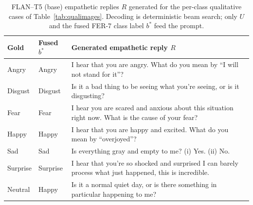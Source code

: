 \documentclass[sigconf,nonacm]{acmart}
\begin{document}
\begin{table}[!htbp]
  \small
  \centering
  \caption{FLAN--T5 (base) empathetic replies $R$ generated for the per-class qualitative cases of Table~\ref{tab:qualimages}. Decoding is deterministic beam search; only $U$ and the fused FER-7 class label $b^{*}$ feed the prompt.}
  \label{tab:qualresponses}
  \setlength{\tabcolsep}{4pt}
  \renewcommand{\arraystretch}{1.2}
  \begin{tabular}{@{}l l p{}@{}}
    \toprule
    \textbf{Gold} & \textbf{Fused $b^{*}$} & \textbf{Generated empathetic reply $R$} \\
    \midrule
    Angry    & Angry    & I hear that you are angry. What do you mean by ``I will not stand for it''? \\
    Disgust  & Disgust  & Is it a bad thing to be seeing what you're seeing, or is it disgusting? \\
    Fear     & Fear     & I hear you are scared and anxious about this situation right now. What is the cause of your fear? \\
    Happy    & Happy    & I hear that you are happy and excited. What do you mean by ``overjoyed''? \\
    Sad      & Sad      & Is everything gray and empty to me? (i) Yes. (ii) No. \\
    Surprise & Surprise & I hear that you're so shocked and surprised I can barely process what just happened, this is incredible. \\
    Neutral  & Happy    & Is it a normal quiet day, or is there something in particular happening to me? \\
    \bottomrule
  \end{tabular}
\end{table}
\end{document}
